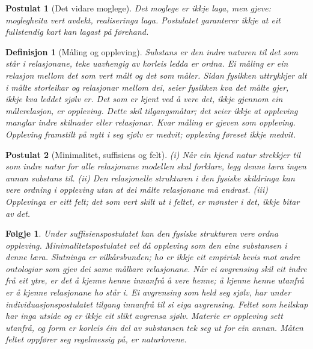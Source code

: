 \documentclass[9pt,twocolumn,a4paper]{article}
\theoremstyle{defstyle}
\newtheorem{definisjon}{Definisjon}
\newtheorem{postulat}{Postulat}
\theoremstyle{formstyle}
\newtheorem{folgje}{Følgje}
\begin{document}
\begin{postulat}[Det vidare moglege]
Det moglege er ikkje laga, men gjeve: moglegheita vert avdekt, realiseringa laga. Postulatet garanterer ikkje at eit fullstendig kart kan lagast på førehand.
\end{postulat}

\begin{definisjon}[Måling og oppleving]
Substans er den indre naturen til det som står i relasjonane, teke uavhengig av korleis ledda er ordna. Ei \emph{måling} er ein relasjon mellom det som vert målt og det som måler. Sidan fysikken uttrykkjer alt i målte storleikar og relasjonar mellom dei, seier fysikken kva det målte \emph{gjer}, ikkje kva leddet sjølv \emph{er}. Det som er kjent ved å vere det, ikkje gjennom ein målerelasjon, er \emph{oppleving}. Dette skil tilgangsmåtar; det seier ikkje at oppleving manglar indre skilnader eller relasjonar. Kvar måling er gjeven som oppleving. Oppleving framstilt på nytt i seg sjølv er \emph{medvit}; oppleving føreset ikkje medvit.
\end{definisjon}

\begin{postulat}[Minimalitet, suffisiens og felt]
(i) Når ein kjend natur strekkjer til som indre natur for alle relasjonane modellen skal forklare, legg denne læra ingen annan substans til. (ii) Den relasjonelle strukturen i den fysiske skildringa kan vere ordning i oppleving utan at dei målte relasjonane må endrast. (iii) Opplevinga er eitt felt; det som vert skilt ut i feltet, er mønster i det, ikkje bitar av det.
\end{postulat}

\begin{folgje}
Under suffisienspostulatet kan den fysiske strukturen vere ordna oppleving. Minimalitetspostulatet vel då oppleving som den eine substansen i denne læra. Slutninga er vilkårsbunden; ho er ikkje eit empirisk bevis mot andre ontologiar som gjev dei same målbare relasjonane. Når ei avgrensing skil eit indre frå eit ytre, er det å kjenne henne innanfrå å vere henne; å kjenne henne utanfrå er å kjenne relasjonane ho står i. Ei avgrensing som held seg sjølv, har under individuasjonspostulatet tilgang innanfrå til si eiga avgrensing. Feltet som heilskap har inga utside og er ikkje eit slikt avgrensa sjølv. Materie er oppleving sett utanfrå, og form er korleis éin del av substansen tek seg ut for ein annan. Måten feltet oppfører seg regelmessig på, er naturlovene.
\end{folgje}
\end{document}
